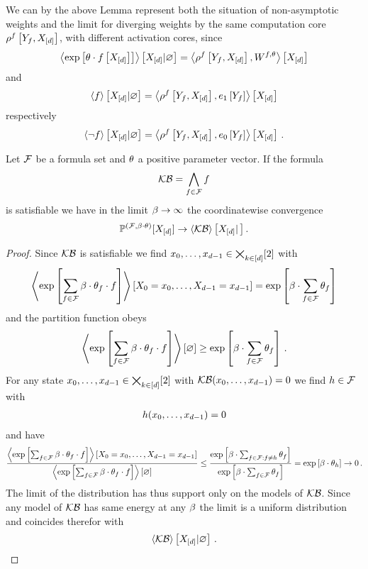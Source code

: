 We can by the above Lemma represent both the situation of non-asymptotic weights and the limit for diverging weights by the same computation core $\rho^{f}\left[Y_{f},X_{[d]}\right]$, with different activation cores, since
\begin{align*}
	\left\langle \mathrm{exp}\left[\theta\cdot f\left[X_{[d]}\right]\right]\right\rangle \left[ X_{[d]} | \varnothing \right] 
	= \left\langle \rho^{f}\left[Y_{f},X_{[d]}\right],W^{f,\theta}\right\rangle \left[ X_{[d]} \right]
\end{align*}
and 
\begin{align*}
	\left\langle f\right\rangle \left[ X_{[d]} | \varnothing \right]
	= \left\langle \rho^{f}\left[Y_{f},X_{[d]}\right],e_1\left[Y_{f}\right]\right\rangle \left[ X_{[d]} \right]
\end{align*}
respectively
\begin{align*}
	\left\langle \lnot f\right\rangle \left[ X_{[d]} | \varnothing \right]
	= \left\langle \rho^{f}\left[Y_{f},X_{[d]}\right],e_0\left[Y_{f}\right]\right\rangle \left[ X_{[d]} \right] \, . 
\end{align*}



\begin{theorem}
	Let $\mathcal{F}$ be a formula set and $\theta$ a positive parameter vector.
	If the formula
		\[ \mathcal{KB} = \bigwedge_{f\in\mathcal{F}} f \]
	is satisfiable we have in the limit $\beta\rightarrow\infty$ the coordinatewise convergence
		\[ \mathbb{P}^{(\mathcal{F},\beta\cdot\theta)}[X_{[d]}] \rightarrow \left\langle \mathcal{KB}\right\rangle \left[ X_{[d]} | \, \right] . \]
\end{theorem}
\begin{proof}
	Since $\mathcal{KB}$ is satisfiable we find $x_{0},\ldots,x_{d-1}\in\bigtimes_{k\in[d]}[2]$ with
		\[  \left\langle \mathrm{exp}\left[\sum_{f\in\mathcal{F}}\beta\cdot \theta_{f} \cdot f\right]\right\rangle \left[ X_{0}=x_{0},\ldots,X_{d-1}=x_{d-1} \right] = \mathrm{exp}\left[\beta \cdot \sum_{f\in\mathcal{F}}\theta_{f}\right]  \]
	and the partition function obeys
		\[ \left\langle \mathrm{exp}\left[\sum_{f\in\mathcal{F}}\beta\cdot \theta_{f} \cdot f\right]\right\rangle \left[ \varnothing \right] \geq  \mathrm{exp}\left[\beta \cdot \sum_{f\in\mathcal{F}}\theta_{f}\right]  \, . \]
	For any state $x_{0},\ldots,x_{d-1}\in\bigtimes_{k\in[d]}[2]$ with $\mathcal{KB}(x_{0},\ldots,x_{d-1})=0$ we find $h\in\mathcal{F}$ with
	\begin{align*}
		h(x_{0},\ldots,x_{d-1})=0
	\end{align*}
	and have
	\begin{align*}
	 	\frac{
		\left\langle \mathrm{exp}\left[\sum_{f\in\mathcal{F}}\beta\cdot \theta_{f} \cdot f\right]\right\rangle \left[ X_{0}=x_{0},\ldots,X_{d-1}=x_{d-1} \right]
		}{
		\left\langle \mathrm{exp}\left[\sum_{f\in\mathcal{F}}\beta\cdot \theta_{f} \cdot f\right]\right\rangle \left[ \varnothing \right]
		} 
		\leq  
	 	\frac{
		\mathrm{exp}\left[\beta\cdot \sum_{f\in\mathcal{F} : f\neq h}\theta_{f}\right]
		}{
		\mathrm{exp}\left[\beta\cdot \sum_{f\in\mathcal{F}}\theta_{f}\right]
		} 
		= \mathrm{exp}\left[\beta \cdot \theta_{h}\right] \rightarrow 0 \, . 
	\end{align*}
	The limit of the distribution has thus support only on the models of $\mathcal{KB}$. 
	Since any model of $\mathcal{KB}$ has same energy at any $\beta$ the limit is a uniform distribution and coincides therefor with
		\[ \left\langle \mathcal{KB}\right\rangle \left[ X_{[d]} | \varnothing \right] \, . \]
\end{proof}

